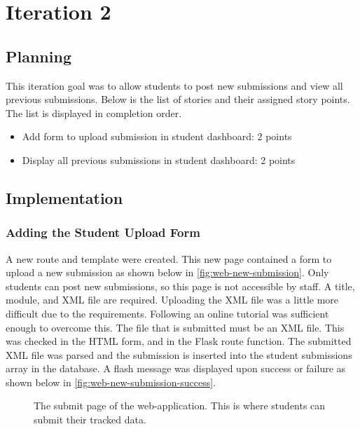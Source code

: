 \chapter{Iteration 2}
\section{Planning}
This iteration goal was to allow students to post new submissions and view all previous submissions. Below is the list of stories and their assigned story points. The list is displayed in completion order.

\begin{itemize}
\item Add form to upload submission in student dashboard: 2 points
\item Display all previous submissions in student dashboard: 2 points
\end{itemize}

\section{Implementation}
\subsection{Adding the Student Upload Form}
A new route and template were created. This new page contained a form to upload a new submission as shown below in \autoref{fig:web-new-submission}. Only students can post new submissions, so this page is not accessible by staff. A title, module, and XML file are required. Uploading the XML file was a little more difficult due to the requirements. Following an online tutorial was sufficient enough to overcome this\cite{FlaskUploadingFiles}. The file that is submitted must be an XML file. This was checked in the HTML form, and in the Flask route function. The submitted XML file was parsed and the submission is inserted into the student submissions array in the database. A flash message was displayed upon success or failure as shown below in \autoref{fig:web-new-submission-success}.

\begin{figure}[H]
  \centering
  \caption[Web New Submission Page]{The submit page of the web-application. This is where students can submit their tracked data.}
  \label{fig:web-new-submission}
\end{figure}

